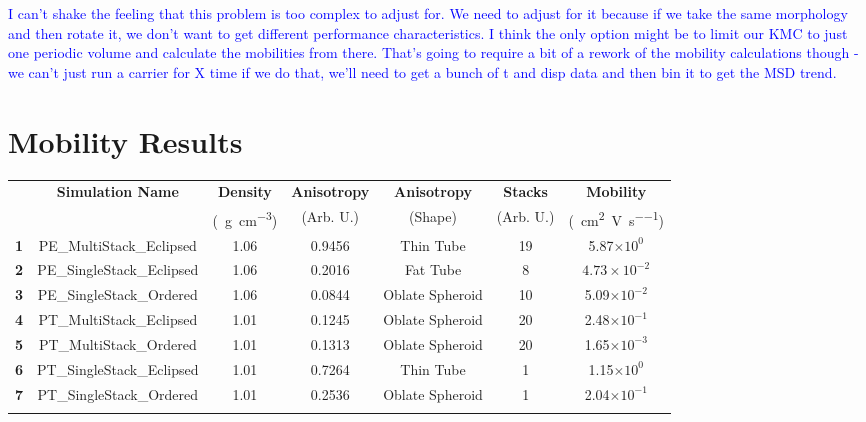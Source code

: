 \documentclass[12pt]{article}
\def\mobunits{\square\centi\meter\per\volt\per\second}
\def\gcm{\gram\per\cubic\centi\meter}
\def\ccg{\cellcolor{gray}}
\begin{document}
\textcolor{blue}{I can't shake the feeling that this problem is too complex to adjust for.
    We need to adjust for it because if we take the same morphology and then rotate it, we don't want to get different performance characteristics.
    I think the only option might be to limit our KMC to just one periodic volume and calculate the mobilities from there.
    That's going to require a bit of a rework of the mobility calculations though - we can't just run a carrier for X time if we do that, we'll need to get a bunch of t and disp data and then bin it to get the MSD trend.}

\clearpage

\section{Mobility Results}


\begin{center}
\begin{tabular}{| c | c | c | c | c | c | c |}
\hline
\rule{0pt}{2.5ex} 
\multirow{2}{*}{\textbf{ID}}&\multirow{2}{*}{\textbf{Simulation Name}}&\textbf{Density}&\textbf{Anisotropy}&\textbf{Anisotropy}&\textbf{Stacks}&\textbf{Mobility}\\
                            &&(\SI{}{\gcm})&(Arb. U.)&(Shape)&(Arb. U.)&(\SI{}{\mobunits})\\
\hhline{|=======|}
\textbf{\ccg1}&\rule{0pt}{2.5ex}\ccg PE\_MultiStack\_Eclipsed&\ccg 1.06&\ccg 0.9456&\ccg Thin Tube&\ccg19&\ccg5.87$\times 10^{0}$\\
\textbf{2}&\rule{0pt}{2.5ex}PE\_SingleStack\_Eclipsed&1.06&0.2016&Fat Tube&8&$4.73\times 10^{-2}$\\
\textbf{\ccg3}&\rule{0pt}{2.5ex}\ccg PE\_SingleStack\_Ordered&\ccg 1.06&\ccg 0.0844&\ccg Oblate Spheroid&\ccg10&\ccg5.09$\times 10^{-2}$\\
\hhline{|=======|}
\textbf{4}&\rule{0pt}{2.5ex}PT\_MultiStack\_Eclipsed&1.01&0.1245&Oblate Spheroid&20&2.48$\times 10^{-1}$\\
\textbf{\ccg5}&\rule{0pt}{2.5ex}\ccg PT\_MultiStack\_Ordered&\ccg 1.01&\ccg 0.1313&\ccg Oblate Spheroid&\ccg20&\ccg1.65$\times 10^{-3}$\\
\textbf{6}&\rule{0pt}{2.5ex}PT\_SingleStack\_Eclipsed&1.01&0.7264&Thin Tube&1&1.15$\times 10^{0}$\\
\textbf{\ccg7}&\rule{0pt}{2.5ex}\ccg PT\_SingleStack\_Ordered&\ccg 1.01&\ccg 0.2536&\ccg Oblate Spheroid&\ccg1&\ccg2.04$\times 10^{-1}$\\
\hhline{-------}
\end{tabular}\label{table:mob}
\end{center}
\end{document}
